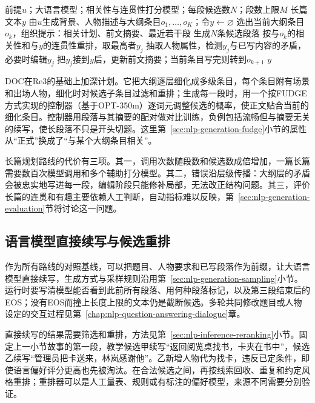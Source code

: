\begin{algorithm}[递归重提示与修订的长篇生成]
  \label{alg:nlp-generation-re3}
  \begin{algorithmic}[1]
    \Require 前提$u$；大语言模型；相关性与连贯性打分模型；每段候选数$N$；段数上限$M$
    \Ensure 长篇文本$y$
    \State 由$u$生成背景、人物描述与大纲条目$o_1,\ldots,o_K$；令$y\gets\varnothing$
      \State 选出当前大纲条目$o_k$，组织提示：相关计划、前文摘要、最近若干段
      \State 生成$N$条候选段落
      \State 按与$o_k$的相关性和与$y$的连贯性重排，取最高者$y_j$
      \State 抽取人物属性，检测$y_j$与已写内容的矛盾，必要时编辑$y_j$
      \State 把$y_j$接到$y$后，更新前文摘要；当前条目写完则转到$o_{k+1}$
    \EndFor
    \State \Return $y$
  \end{algorithmic}
\end{algorithm}

DOC在Re3的基础上加深计划。它把大纲逐层细化成多级条目，每个条目附有场景和出场人物，细化时对候选子条目过滤和重排；生成每一段时，用一个按FUDGE方式实现的控制器（基于OPT-350m）逐词元调整候选的概率，使正文贴合当前的细化条目。控制器用段落与其摘要的配对做对比训练，负例包括流畅但与摘要无关的续写，使长段落不只是开头切题。这里第~\ref{sec:nlp-generation-fudge}小节的属性从“正式”换成了“与某个大纲条目相关”。

长篇规划路线的代价有三项。其一，调用次数随段数和候选数成倍增加，一篇长篇需要数百次模型调用和多个辅助打分模型。其二，错误沿层级传播：大纲层的矛盾会被忠实地写进每一段，编辑阶段只能修补局部，无法改正结构问题。其三，评价长篇的连贯和有趣主要依赖人工判断，自动指标难以反映，第~\ref{sec:nlp-generation-evaluation}节将讨论这一问题。

\subsection{语言模型直接续写与候选重排}
\label{sec:nlp-generation-continuation}

作为所有路线的对照基线，可以把题目、人物要求和已写段落作为前缀，让大语言模型直接续写，生成方式与采样规则沿用第~\ref{sec:nlp-generation-sampling}小节。运行时要写清模型能否看到此前所有段落、用何种段落标记，以及第三段结束后的EOS；没有EOS而撞上长度上限的文本仍是截断候选。多轮共同修改题目或人物设定的交互过程见第~\ref{chap:nlp-question-answering-dialogue}章。

直接续写的结果需要筛选和重排，方法见第~\ref{sec:nlp-inference-reranking}小节。固定上一小节故事的第一段，教学候选甲续写“返回阅览桌找书，卡夹在书中”，候选乙续写“管理员把卡送来，林岚感谢他”。乙新增人物代为找卡，违反已定条件，即使语言偏好评分更高也先被淘汰。在合法候选之间，再按线索回收、重复和约定风格重排；重排器可以是人工量表、规则或有标注的偏好模型，来源不同需要分别验证。

